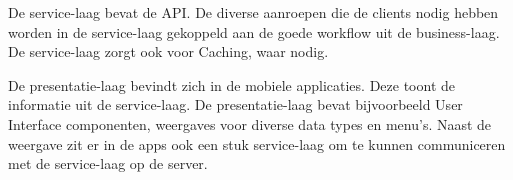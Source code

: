 De service-laag bevat de API. De diverse aanroepen die de clients nodig hebben
worden in de service-laag gekoppeld aan de goede workflow uit de business-laag. De
service-laag zorgt ook voor Caching, waar nodig.

De presentatie-laag bevindt zich in de mobiele applicaties. Deze toont de informatie uit de
service-laag. De presentatie-laag bevat bijvoorbeeld User Interface componenten, 
weergaves voor diverse data types en menu's. Naast de weergave zit er in de apps 
ook een stuk service-laag om te kunnen communiceren met de service-laag op de 
server.